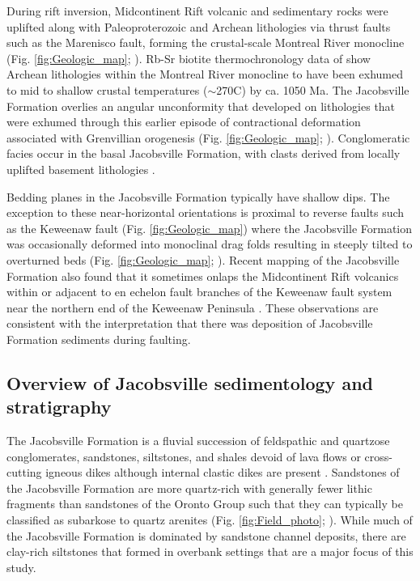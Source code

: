 During rift inversion, Midcontinent Rift volcanic and sedimentary rocks were uplifted along with Paleoproterozoic and Archean lithologies via thrust faults such as the Marenisco fault, forming the crustal-scale Montreal River monocline (Fig. \ref{fig:Geologic_map}; ). Rb-Sr biotite thermochronology data of  show Archean lithologies within the Montreal River monocline to have been exhumed to mid to shallow crustal temperatures ($\sim$270\textdegree C) by ca. 1050 Ma. The Jacobsville Formation overlies an angular unconformity that developed on lithologies that were exhumed through this earlier episode of contractional deformation associated with Grenvillian orogenesis (Fig. \ref{fig:Geologic_map}; ). Conglomeratic facies occur in the basal Jacobsville Formation, with clasts derived from locally uplifted basement lithologies \cite{Irving1885a, Hamblin1958a, Kalliokoski1982a}.

Bedding planes in the Jacobsville Formation typically have shallow dips. The exception to these near-horizontal orientations is proximal to reverse faults such as the Keweenaw fault (Fig. \ref{fig:Geologic_map}) where the Jacobsville Formation was occasionally deformed into monoclinal drag folds resulting in steeply tilted to overturned beds (Fig. \ref{fig:Geologic_map}; ). Recent mapping of the Jacobsville Formation also found that it sometimes onlaps the Midcontinent Rift volcanics within or adjacent to en echelon fault branches of the Keweenaw fault system near the northern end of the Keweenaw Peninsula \cite{Tyrrell2019a, Mueller2021a}. These observations are consistent with the interpretation that there was deposition of Jacobsville Formation sediments during faulting.

\subsection*{Overview of Jacobsville sedimentology and stratigraphy}

The Jacobsville Formation is a fluvial succession of feldspathic and quartzose conglomerates, sandstones, siltstones, and shales devoid of lava flows or cross-cutting igneous dikes although internal clastic dikes are present \cite{Hamblin1958a}. Sandstones of the Jacobsville Formation are more quartz-rich with generally fewer lithic fragments than sandstones of the Oronto Group such that they can typically be classified as subarkose to quartz arenites (Fig. \ref{fig:Field_photo}; ). While much of the Jacobsville Formation is dominated by sandstone channel deposits, there are clay-rich siltstones that formed in overbank settings that are a major focus of this study.

